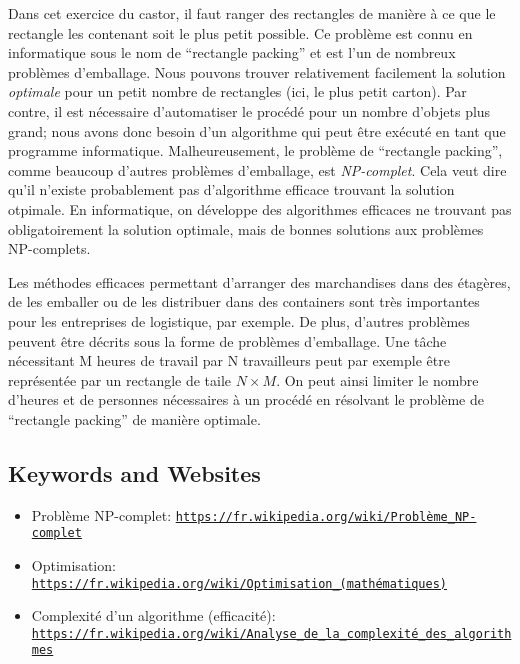\documentclass[a4paper,11pt]{report}
\newcommand{\BrochureUrlText}[1]{\texttt{#1}}
\begin{document}
Dans cet exercice du castor, il faut ranger des rectangles de manière à ce que le rectangle les contenant soit le plus petit possible. Ce problème est connu en informatique sous le nom de “rectangle packing” et est l’un de nombreux problèmes d’emballage. Nous pouvons trouver relativement facilement la solution \emph{optimale} pour un petit nombre de rectangles (ici, le plus petit carton). Par contre, il est nécessaire d’automatiser le procédé pour un nombre d’objets plus grand; nous avons donc besoin d’un algorithme qui peut être exécuté en tant que programme informatique. Malheureusement, le problème de “rectangle packing”, comme beaucoup d’autres problèmes d’emballage, est \emph{NP-complet}. Cela veut dire qu’il n’existe probablement pas d’algorithme efficace trouvant la solution otpimale. En informatique, on développe des algorithmes efficaces ne trouvant pas obligatoirement la solution optimale, mais de bonnes solutions aux problèmes NP-complets.

Les méthodes efficaces permettant d’arranger des marchandises dans des étagères, de les emballer ou de les distribuer dans des containers sont très importantes pour les entreprises de logistique, par exemple. De plus, d’autres problèmes peuvent être décrits sous la forme de problèmes d’emballage. Une tâche nécessitant M heures de travail par N travailleurs peut par exemple être représentée par un rectangle de taile ${N \times M}$. On peut ainsi limiter le nombre d’heures et de personnes nécessaires à un procédé en résolvant le problème de “rectangle packing” de manière optimale.

{\raggedright

\subsection*{Keywords and Websites}

\begin{itemize}
  \item Problème NP-complet: \href{https://fr.wikipedia.org/wiki/Probl\%C3\%A8me_NP-complet}{\BrochureUrlText{https://fr.wikipedia.org/wiki/Problème\_NP-complet}}
  \item Optimisation: \href{https://fr.wikipedia.org/wiki/Optimisation_(math\%C3\%A9matiques)}{\BrochureUrlText{https://fr.wikipedia.org/wiki/Optimisation\_(mathématiques)}}
  \item Complexité d’un algorithme (efficacité): \href{https://fr.wikipedia.org/wiki/Analyse_de_la_complexit\%C3\%A9_des_algorithmes}{\BrochureUrlText{https://fr.wikipedia.org/wiki/Analyse\_de\_la\_complexité\_des\_algorithmes}}
\end{itemize}


}
\end{document}
